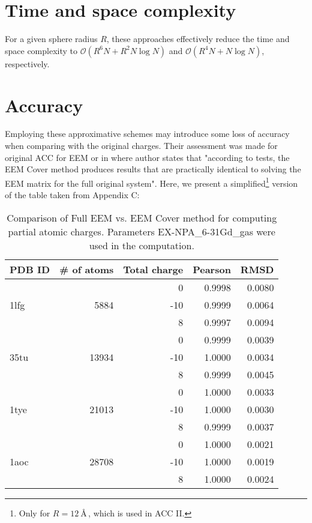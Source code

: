 \documentclass[oneside]{memoir}
\begin{document}
\section*{Time and space complexity}

For a given sphere radius $R$, these approaches effectively reduce the time and space complexity to ${\mathcal O}(R^6N + R^2N\log N)$ and ${\mathcal O}(R^4N + N\log N)$, respectively. \cite{Ionescu2015}

\section*{Accuracy}

Employing these approximative schemes may introduce some loss of accuracy when comparing with the original charges. Their assessment was made for original ACC for EEM \cite{Ionescu2015} or in \cite{Sehnal2015} where author states that "according to tests, the EEM Cover method produces results that are practically identical to solving the EEM matrix for the full original system". Here, we present a simplified\footnote{Only for $R = 12~$\AA\,, which is used in ACC II.} version of the table taken from Appendix C:

\begin{table}[h]
\renewcommand{\thetable}{1}
\begin{center}
\begin{tabular}{lrrrr}
\toprule
\textbf{PDB ID} & \textbf{\# of atoms} & \textbf{Total charge} & \textbf{Pearson} & \textbf{RMSD}\\
\midrule
\multirow{3}{*}{1lfg} & \multirow{3}{*}{5884}  &   0 & 0.9998 & 0.0080\\
                      &                        & -10 & 0.9999 & 0.0064\\
                      &                        &   8 & 0.9997 & 0.0094\\
\midrule
\multirow{3}{*}{35tu} & \multirow{3}{*}{13934} &   0 & 0.9999 & 0.0039\\
                      &                        & -10 & 1.0000 & 0.0034\\
                      &                        &   8 & 0.9999 & 0.0045\\
\midrule
\multirow{3}{*}{1tye} & \multirow{3}{*}{21013} &   0 & 1.0000 & 0.0033\\
                      &                        & -10 & 1.0000 & 0.0030\\
                      &                        &   8 & 0.9999 & 0.0037\\
\midrule
\multirow{3}{*}{1aoc} & \multirow{3}{*}{28708} &   0 & 1.0000 & 0.0021\\
                      &                        & -10 & 1.0000 & 0.0019\\
                      &                        &   8 & 1.0000 & 0.0024\\
\bottomrule
\end{tabular}
\caption{Comparison of Full EEM vs. EEM Cover method for computing partial atomic charges. Parameters EX-NPA\_6-31Gd\_gas \cite{Ionescu2013} were used in the computation.}
\end{center}
\end{table}
\end{document}
